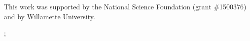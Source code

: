 \documentclass[
30pt,%
a1paper, 
landscape,%
margin = 0mm,
innermargin = -2cm,
colspace = 5mm,
subcolspace = 0mm,
blockverticalspace=.5cm %
]{tikzposter}
\begin{document}
{{\begin{minipage}{.25\textwidth}
\begin{minipage}{.25\textwidth}
		\end{minipage}
		\begin{minipage}{.7\textwidth}
			\large
			This work was supported by the National Science Foundation (grant \#1500376) and by Willamette University.
		\end{minipage}
	\end{minipage}
}
   };






 
\end{document}
